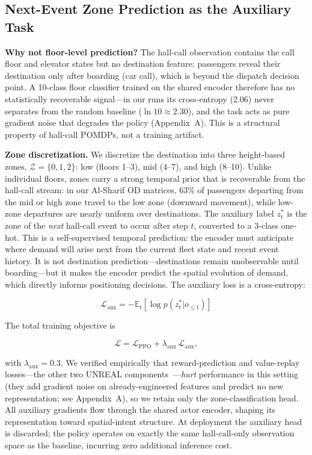 \documentclass[conference]{IEEEtran}
\begin{document}
\subsection{Next-Event Zone Prediction as the Auxiliary Task}

\textbf{Why not floor-level prediction?} The hall-call observation
contains the call floor and elevator states but no destination
feature: passengers reveal their destination only after boarding
(car call), which is beyond the dispatch decision point. A 10-class
floor classifier trained on the shared encoder therefore has no
statistically recoverable signal---in our runs its cross-entropy
(2.06) never separates from the random baseline ($\ln 10 \approx
2.30$), and the task acts as pure gradient noise that degrades the
policy (Appendix~A). This is a structural property of hall-call
POMDPs, not a training artifact.

\textbf{Zone discretization.} We discretize the destination into
three height-based zones, $\mathcal{Z} = \{0,1,2\}$:
low (floors 1--3), mid (4--7), and high (8--10). Unlike individual
floors, zones carry a strong temporal prior that is recoverable from
the hall-call stream: in our Al-Sharif OD matrices, 63\% of
passengers departing from the mid or high zone travel to the low
zone (downward movement), while low-zone departures are nearly
uniform over destinations. The auxiliary label $z_t^*$ is the zone of the \emph{next}
hall-call event to occur after step $t$, converted to a 3-class
one-hot. This is a self-supervised temporal prediction: the encoder
must anticipate where demand will arise next from the current
fleet state and recent event history. It is not destination
prediction---destinations remain unobservable until boarding---but
it makes the encoder predict the spatial evolution of demand, which
directly informs positioning decisions. The auxiliary loss is a cross-entropy:

\begin{equation}
\mathcal{L}_{\text{aux}} = -\mathbb{E}_t\left[
\log p(z_t^* | o_{\le t})\right]
\end{equation}

The total training objective is

\begin{equation}
\mathcal{L} = \mathcal{L}_{\text{PPO}} + \lambda_{\text{aux}}\,
\mathcal{L}_{\text{aux}},
\label{eq:total_loss}
\end{equation}

with $\lambda_{\text{aux}} = 0.3$. We verified empirically that
reward-prediction and value-replay losses---the other two UNREAL
components~\cite{jaderberg2017unreal}---\emph{hurt} performance in
this setting (they add gradient noise on already-engineered features
and predict no new representation; see Appendix~A), so we retain only
the zone-classification head. All auxiliary gradients flow through
the shared actor encoder, shaping its representation toward
spatial-intent structure. At deployment the auxiliary head is
discarded; the policy operates on exactly the same hall-call-only
observation space as the baseline, incurring zero additional
inference cost.
\end{document}
